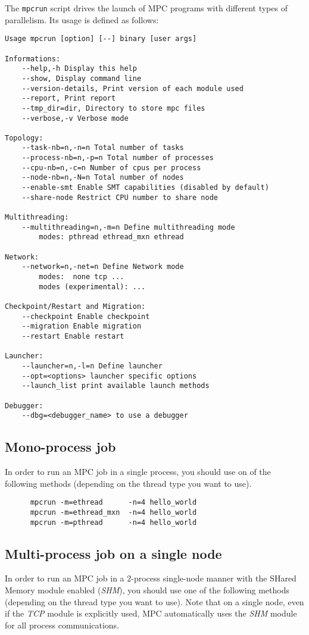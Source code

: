 \documentclass[a4paper,11pt]{article}
\begin{document}
The \texttt{mpcrun} script drives the launch of MPC programs with different
types of parallelism.
Its usage is defined as follows:
\begin{verbatim}
Usage mpcrun [option] [--] binary [user args]

Informations:
    --help,-h Display this help
    --show, Display command line
    --version-details, Print version of each module used
    --report, Print report
    --tmp_dir=dir, Directory to store mpc files
    --verbose,-v Verbose mode

Topology:
    --task-nb=n,-n=n Total number of tasks
    --process-nb=n,-p=n Total number of processes
    --cpu-nb=n,-c=n Number of cpus per process
    --node-nb=n,-N=n Total number of nodes
    --enable-smt Enable SMT capabilities (disabled by default)
    --share-node Restrict CPU number to share node

Multithreading:
    --multithreading=n,-m=n Define multithreading mode
        modes: pthread ethread_mxn ethread

Network:
    --network=n,-net=n Define Network mode
        modes:  none tcp ...
        modes (experimental): ...

Checkpoint/Restart and Migration:
    --checkpoint Enable checkpoint
    --migration Enable migration
    --restart Enable restart

Launcher:
    --launcher=n,-l=n Define launcher
    --opt=<options> launcher specific options
    --launch_list print available launch methods

Debugger:
    --dbg=<debugger_name> to use a debugger

\end{verbatim}

\subsection{Mono-process job}
In order to run an MPC job in a single process, you should use on of the following methods (depending on the thread type you want to use).

\begin{verbatim}
      mpcrun -m=ethread      -n=4 hello_world
      mpcrun -m=ethread_mxn  -n=4 hello_world
      mpcrun -m=pthread      -n=4 hello_world
\end{verbatim}


\subsection{Multi-process job on a single node}
In order to run an MPC job in a $2$-process single-node manner with the SHared Memory module enabled (\emph{SHM}),
you should use one of the following methods (depending on the thread type you want to use).
Note that on a single node, even if the \emph{TCP} module is explicitly used,
MPC automatically uses the \emph{SHM} module for all process communications.
\end{document}
